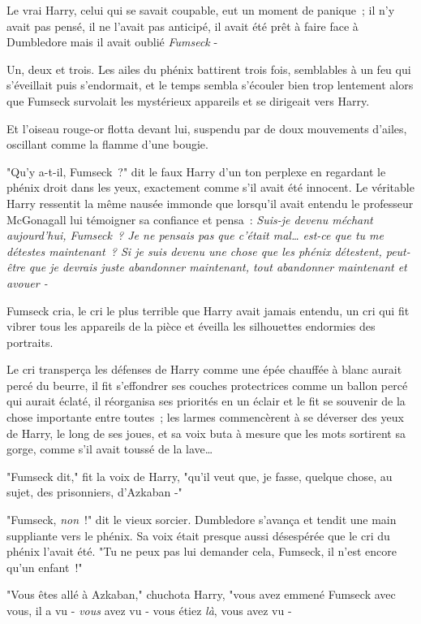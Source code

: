 Le vrai Harry, celui qui se savait coupable, eut un moment de panique~; il n'y avait pas pensé, il ne l'avait pas anticipé, il avait été prêt à faire face à Dumbledore mais il avait oublié \emph{Fumseck} -

Un, deux et trois. Les ailes du phénix battirent trois fois, semblables à un feu qui s'éveillait puis s'endormait, et le temps sembla s'écouler bien trop lentement alors que Fumseck survolait les mystérieux appareils et se dirigeait vers Harry.

Et l'oiseau rouge-or flotta devant lui, suspendu par de doux mouvements d'ailes, oscillant comme la flamme d'une bougie.

"Qu'y a-t-il, Fumseck~?" dit le faux Harry d'un ton perplexe en regardant le phénix droit dans les yeux, exactement comme s'il avait été innocent. Le véritable Harry ressentit la même nausée immonde que lorsqu'il avait entendu le professeur McGonagall lui témoigner sa confiance et pensa~: \emph{Suis-je devenu méchant aujourd'hui, Fumseck~? Je ne pensais pas que c'était mal… est-ce que tu me détestes maintenant~? Si je suis devenu une chose que les phénix détestent, peut-être que je devrais juste abandonner maintenant, tout abandonner maintenant et avouer -}

Fumseck cria, le cri le plus terrible que Harry avait jamais entendu, un cri qui fit vibrer tous les appareils de la pièce et éveilla les silhouettes endormies des portraits.

Le cri transperça les défenses de Harry comme une épée chauffée à blanc aurait percé du beurre, il fit s'effondrer ses couches protectrices comme un ballon percé qui aurait éclaté, il réorganisa ses priorités en un éclair et le fit se souvenir de la chose importante entre toutes~; les larmes commencèrent à se déverser des yeux de Harry, le long de ses joues, et sa voix buta à mesure que les mots sortirent sa gorge, comme s'il avait toussé de la lave…

"Fumseck dit," fit la voix de Harry, "qu'il veut que, je fasse, quelque chose, au sujet, des prisonniers, d'Azkaban -"

"Fumseck, \emph{non}~!" dit le vieux sorcier. Dumbledore s'avança et tendit une main suppliante vers le phénix. Sa voix était presque aussi désespérée que le cri du phénix l'avait été. "Tu ne peux pas lui demander cela, Fumseck, il n'est encore qu'un enfant~!"

"Vous êtes allé à Azkaban," chuchota Harry, "vous avez emmené Fumseck avec vous, il a vu - \emph{vous} avez vu - vous étiez \emph{là}, vous avez vu - 

